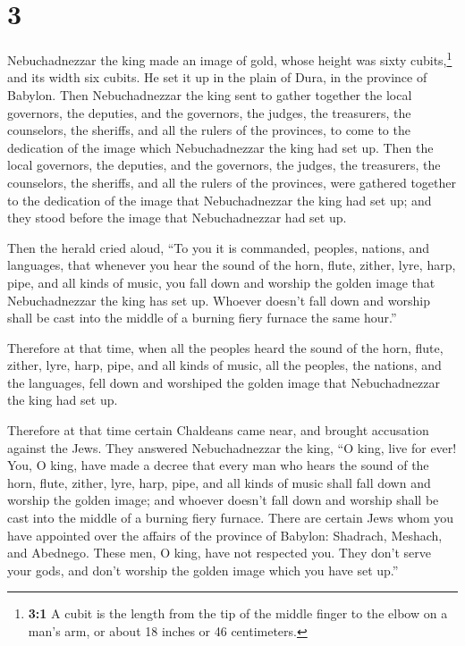 \hypertarget{section-2}{%
\section{3}\label{section-2}}

 Nebuchadnezzar the king made an image of gold, whose
height was sixty cubits,\footnote{\textbf{3:1} A cubit is the length
  from the tip of the middle finger to the elbow on a man's arm, or
  about 18 inches or 46 centimeters.} and its width six cubits. He set
it up in the plain of Dura, in the province of Babylon. 
Then Nebuchadnezzar the king sent to gather together the local
governors, the deputies, and the governors, the judges, the treasurers,
the counselors, the sheriffs, and all the rulers of the provinces, to
come to the dedication of the image which Nebuchadnezzar the king had
set up.  Then the local governors, the deputies, and the
governors, the judges, the treasurers, the counselors, the sheriffs, and
all the rulers of the provinces, were gathered together to the
dedication of the image that Nebuchadnezzar the king had set up; and
they stood before the image that Nebuchadnezzar had set up.

 Then the herald cried aloud, ``To you it is commanded,
peoples, nations, and languages,  that whenever you hear
the sound of the horn, flute, zither, lyre, harp, pipe, and all kinds of
music, you fall down and worship the golden image that Nebuchadnezzar
the king has set up.  Whoever doesn't fall down and
worship shall be cast into the middle of a burning fiery furnace the
same hour.''

 Therefore at that time, when all the peoples heard the
sound of the horn, flute, zither, lyre, harp, pipe, and all kinds of
music, all the peoples, the nations, and the languages, fell down and
worshiped the golden image that Nebuchadnezzar the king had set up.

 Therefore at that time certain Chaldeans came near, and
brought accusation against the Jews.  They answered
Nebuchadnezzar the king, ``O king, live for ever!  You, O
king, have made a decree that every man who hears the sound of the horn,
flute, zither, lyre, harp, pipe, and all kinds of music shall fall down
and worship the golden image;  and whoever doesn't fall
down and worship shall be cast into the middle of a burning fiery
furnace.  There are certain Jews whom you have appointed
over the affairs of the province of Babylon: Shadrach, Meshach, and
Abednego. These men, O king, have not respected you. They don't serve
your gods, and don't worship the golden image which you have set up.''

